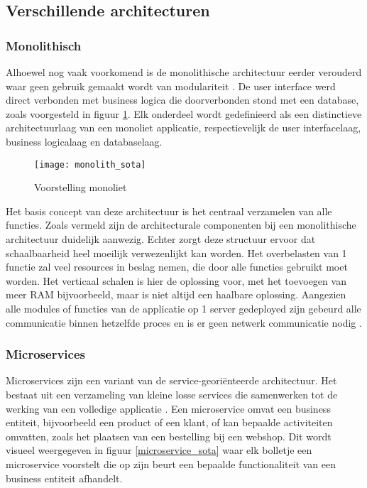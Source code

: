 \subsection{Verschillende architecturen}
\subsubsection{Monolithisch}
Alhoewel nog vaak voorkomend is de monolithische architectuur eerder verouderd waar geen gebruik gemaakt wordt van modulariteit \autocite{Megargel2020}. De user interface werd direct verbonden met business logica die doorverbonden stond met een database, zoals voorgesteld in figuur \ref{monolith_sota}. Elk onderdeel wordt gedefinieerd als een distinctieve architectuurlaag van een monoliet applicatie, respectievelijk de user interfacelaag, business logicalaag en databaselaag. \\

\begin{figure}[H]
    \texttt{[image: monolith\_sota]}
    \centering
    \caption{Voorstelling monoliet \autocite{Megargel2020}}
    \label{monolith_sota}
\end{figure}


Het basis concept van deze architectuur is het centraal verzamelen van alle functies. Zoals vermeld zijn de architecturale componenten bij een monolithische architectuur duidelijk aanwezig. Echter zorgt deze structuur ervoor dat schaalbaarheid heel moeilijk verwezenlijkt kan worden. Het overbelasten van 1 functie zal veel resources in beslag nemen, die door alle functies gebruikt moet worden. Het verticaal schalen is hier de oplossing voor, met het toevoegen van meer RAM bijvoorbeeld, maar is niet altijd een haalbare oplossing. Aangezien alle modules of functies van de applicatie op 1 server gedeployed zijn gebeurd alle communicatie binnen hetzelfde proces en is er geen netwerk communicatie nodig \autocite{Ozkaya2023}. 


\subsubsection{Microservices}
Microservices zijn een variant van de service-georiënteerde architectuur. Het bestaat uit een verzameling van kleine losse services die samenwerken tot de werking van een volledige applicatie \autocite{Megargel2020}. Een microservice omvat een business entiteit, bijvoorbeeld een product of een klant, of kan bepaalde activiteiten omvatten, zoals het plaatsen van een bestelling bij een webshop. Dit wordt visueel weergegeven in figuur \ref{microservice_sota} waar elk bolletje een microservice voorstelt die op zijn beurt een bepaalde functionaliteit van een business entiteit afhandelt.\\

